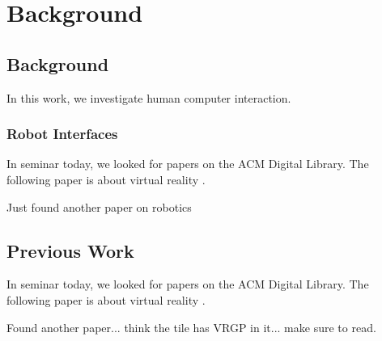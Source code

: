 \chapter{Background}
\label{chap:background}

\linespread{4}

\section{Background}

In this work, we investigate human computer interaction. 

\subsection{Robot Interfaces}

In seminar today, we looked for papers on the ACM Digital Library. The
following paper is about virtual reality \cite{Kreylos:2006:ESW:1128923.1128948}.

Just found another paper on robotics  \cite{Drascic89}

\section{Previous Work}

In seminar today, we looked for papers on the ACM Digital Library. The
following paper is about virtual reality
\cite{Kreylos:2006:ESW:1128923.1128948}.

Found another paper... think the tile has VRGP in it... make sure to read.





